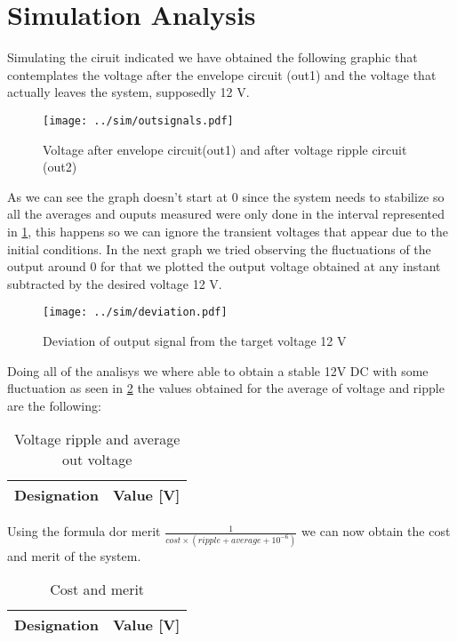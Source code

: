 \section{Simulation Analysis} \label{sec:simulation}

Simulating the ciruit indicated we have obtained the following graphic that contemplates the voltage after the envelope circuit (out1) and the voltage that actually leaves the system, supposedly 12 V.

\begin{figure}[H]
  \centering
  \small
  \texttt{[image: ../sim/outsignals.pdf]}
  \caption{Voltage after envelope circuit(out1) and after voltage ripple circuit (out2)}
  \label{fig:out1_out2}
\end{figure}

As we can see the graph doesn't start at 0 since the system needs to stabilize so all the averages and ouputs measured were only done in the interval represented in \ref{fig:out1_out2}, this happens so we can ignore the transient voltages that appear due to the initial conditions.
In the next graph we tried observing the fluctuations of the output around 0 for that we plotted the output voltage obtained at any instant subtracted by the desired voltage 12 V.

\begin{figure}[H]
  \centering
  \texttt{[image: ../sim/deviation.pdf]}
  \vspace{-5mm}
  \caption{Deviation of output signal from the target voltage 12 V }
  \label{fig:deviation}
\end{figure}

Doing all of the analisys we where able to obtain a stable 12V DC  with some fluctuation as seen in \ref{fig:deviation} the values obtained for the average of voltage and ripple are the following:

\begin{table}[H]
  \centering
  \begin{tabular}{|c|c|}
    \hline
        {\bf Designation} & {\bf Value [V]} \\ \hline
        
  \end{tabular}
  \caption{Voltage ripple and average out voltage} 
  \label{tab:rip}
\end{table}

Using the formula dor merit $\frac{1}{cost \times (ripple +average+10^{-6})}$ we can now obtain the cost and merit of the system.


\begin{table}[H]
  \centering
  \begin{tabular}{|c|c|}
    \hline
        {\bf Designation} & {\bf Value [V]} \\ \hline
        
  \end{tabular}
  \caption{Cost and merit} 
  \label{tab:rip}
\end{table}

